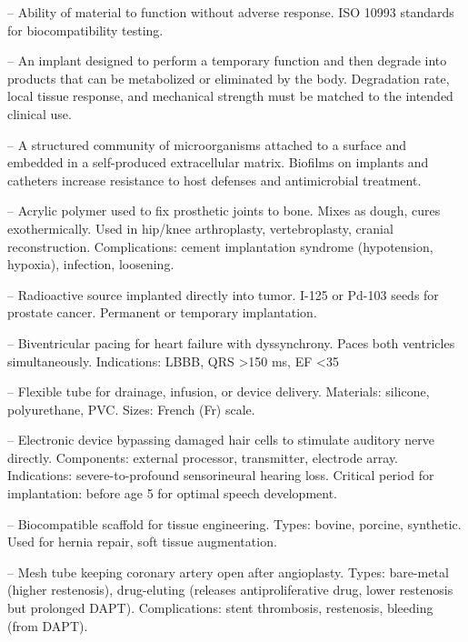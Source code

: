 -- Ability of material to function without adverse response. ISO 10993 standards for biocompatibility testing.

-- An implant designed to perform a temporary function and then degrade into products that can be metabolized or eliminated by the body. Degradation rate, local tissue response, and mechanical strength must be matched to the intended clinical use.


-- A structured community of microorganisms attached to a surface and embedded in a self-produced extracellular matrix. Biofilms on implants and catheters increase resistance to host defenses and antimicrobial treatment.

-- Acrylic polymer used to fix prosthetic joints to bone. Mixes as dough, cures exothermically. Used in hip/knee arthroplasty, vertebroplasty, cranial reconstruction. Complications: cement implantation syndrome (hypotension, hypoxia), infection, loosening.

-- Radioactive source implanted directly into tumor. I-125 or Pd-103 seeds for prostate cancer. Permanent or temporary implantation.

-- Biventricular pacing for heart failure with dyssynchrony. Paces both ventricles simultaneously. Indications: LBBB, QRS >150 ms, EF <35%

-- Flexible tube for drainage, infusion, or device delivery. Materials: silicone, polyurethane, PVC. Sizes: French (Fr) scale.

-- Electronic device bypassing damaged hair cells to stimulate auditory nerve directly. Components: external processor, transmitter, electrode array. Indications: severe-to-profound sensorineural hearing loss. Critical period for implantation: before age 5 for optimal speech development.

-- Biocompatible scaffold for tissue engineering. Types: bovine, porcine, synthetic. Used for hernia repair, soft tissue augmentation.

-- Mesh tube keeping coronary artery open after angioplasty. Types: bare-metal (higher restenosis), drug-eluting (releases antiproliferative drug, lower restenosis but prolonged DAPT). Complications: stent thrombosis, restenosis, bleeding (from DAPT).

